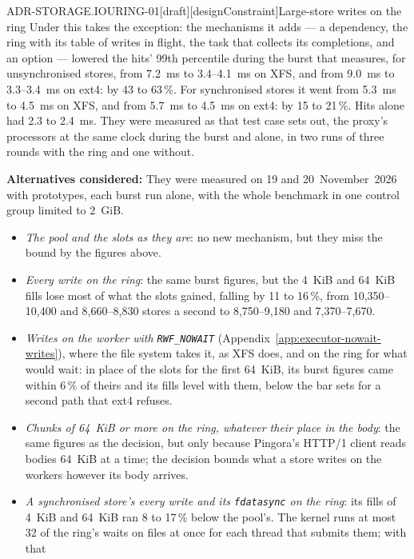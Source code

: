 \begin{requirement}{ADR-STORAGE.IOURING-01}[draft][designConstraint]{Large-store writes on the ring}
  Under  this takes the exception: the mechanisms it
  adds --- a dependency, the ring with its table of writes in flight, the
  task that collects its completions, and an option ---
  lowered the hits' 99th percentile during the burst that
   measures, for unsynchronised stores,
  from 7.2~ms to 3.4--4.1~ms on XFS, and from 9.0~ms to 3.3--3.4~ms on
  ext4: by 43 to 63\,\%. For synchronised stores it went from 5.3~ms to
  4.5~ms on XFS, and from 5.7~ms to 4.5~ms on ext4: by 15 to 21\,\%. Hits
  alone had 2.3 to 2.4~ms. They were measured as that test case sets out,
  the proxy's processors at the same clock during the burst and alone, in
  two runs of three rounds with the ring and one without.

  \textbf{Alternatives considered:} They were measured on 19 and
  20~November~2026 with prototypes, each burst run alone, with the whole
  benchmark in one control group limited to 2~GiB.
  \begin{itemize}
    \item \emph{The pool and the slots as they are}: no new mechanism, but
      they miss the bound by the figures above.
    \item \emph{Every write on the ring}: the same burst figures, but the
      4~KiB and 64~KiB fills lose most of what the slots gained, falling by
      11 to 16\,\%, from 10{,}350--10{,}400 and 8{,}660--8{,}830 stores a
      second to 8{,}750--9{,}180 and 7{,}370--7{,}670.
    \item \emph{Writes on the worker with \texttt{RWF\_NOWAIT}}
      (Appendix~\ref{app:executor-nowait-writes}), where the file system
      takes it, as XFS does, and on the ring for what would wait: in place
      of the slots for the first 64~KiB, its burst figures came within
      6\,\% of theirs and its fills level with them, below the bar
       sets for a second path that ext4 refuses.
    \item \emph{Chunks of 64~KiB or more on the ring, whatever their place
      in the body}: the same figures as the decision, but only because
      Pingora's HTTP/1 client reads bodies 64~KiB at a time; the decision
      bounds what a store writes on the workers however its body arrives.
    \item \emph{A synchronised store's every write and its
      \texttt{fdatasync} on the ring}: its fills of 4~KiB and 64~KiB ran 8
      to 17\,\% below the pool's. The kernel runs at most 32 of the ring's
      waits on files at once for each thread that submits them; with that

\end{itemize}
\end{requirement}
